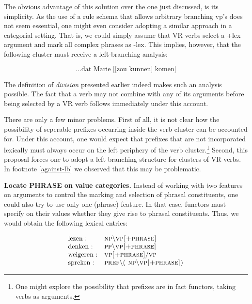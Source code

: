 The obvious advantage of this solution over the one just discussed, is its  
simplicity. As the use of a rule schema that allows arbitrary branching {\sc 
vp}'s does not seem essential, one might even consider adopting a similar 
approach in a categorial setting. That is, we could simply assume that VR verbs 
select a {\sc +lex} argument and mark all complex phrases as {\sc -lex}. 
This implies, however, that the following
cluster must receive a left-branching analysis:

\begin{equation}
\mbox{\ldots dat Marie [[zou kunnen] komen]}
\end{equation}

\noindent The definition of {\em division} presented earlier indeed makes such
an analysis possible.  The fact that a verb may not combine with any of its
arguments before being selected by a VR verb follows immediately under this
account.

There are only a few minor problems.  First of all, it is not clear how the
possibility of seperable prefixes occurring inside the verb cluster can be
accounted for.  Under this account, one would expect that prefixes that are not
incorporated lexically must always occur on the left periphery of the verb
cluster.\footnote{One might explore the possibility that prefixes are in fact
functors, taking verbs as arguments.}  Second, this proposal forces one to adopt
a left-branching structure for clusters of VR verbs.  In footnote
\ref{against-lb} we observed that this may be problematic.


{\bf Locate PHRASE on value categories.}  Instead of working with two features
 on arguments to control the marking and selection of phrasal constituents, one
 could also try to use only one ({\sc phrase}) feature.  In that case, functors
 must specify on their values whether they give rise to phrasal constituents.
 Thus, we would obtain the following lexical entries:

\begin{equation}
\begin{array}[t]{ll}
\mbox{lezen :} & \mbox{\sc np$\backslash$vp[+phrase]} \\ 
\mbox{denken :}& \mbox{\sc pp$\backslash$vp[+phrase]} \\
\mbox{weigeren :} & \mbox{\sc vp[+phrase]}/ \mbox{\sc vp} \\ 
\mbox{spreken :} & \mbox{\sc pref$\backslash($ np$\backslash$vp[+phrase])}
\end{array}
\end{equation}

